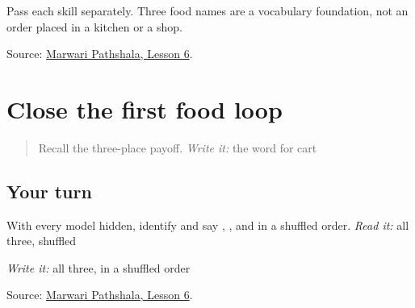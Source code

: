 Pass each skill separately. Three food names are a vocabulary foundation, not an order placed in a kitchen or a shop.

\begin{tcolorbox}[breakable,colback=teal!4,colframe=teal!35!black,title={Before you move on}]
Source: \href{https://www.marwaripathshala.com/marwari-lesson-6-english}{Marwari Pathshala, Lesson 6}.
\end{tcolorbox}
\section[Practice]{Close the first food loop}

\label{lesson:MW-R18-food-close}



\begin{quote}
Recall the three-place payoff. \emph{Write it:} the word for cart
\end{quote}

\subsection*{Your turn}
With every model hidden, identify and say \textbf{}, \textbf{}, and \textbf{} in a shuffled order. \emph{Read it:} all three, shuffled

\emph{Write it:} all three, in a shuffled order

\begin{tcolorbox}[breakable,colback=teal!4,colframe=teal!35!black,title={Before you move on}]
Source: \href{https://www.marwaripathshala.com/marwari-lesson-6-english}{Marwari Pathshala, Lesson 6}.
\end{tcolorbox}
